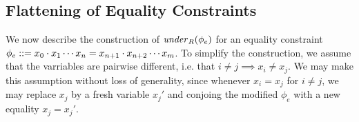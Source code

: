 \documentclass[sigplan,review,anonymous]{acmart}\settopmatter{printfolios=true,printccs=false,printacmref=false}
\begin{document}
%
%
%





\subsection{Flattening of Equality Constraints} \label{section:eq}

We now describe the construction of $\mathit{under}_R(\phi_e)$ for an equality constraint $\phi_e::= x_0\cdot x_1 \cdots x_n = x_{n+1}\cdot x_{n+2} \cdots x_m$. 
%
To simplify the construction, we assume that the varriables are pairwise different, i.e. that $i\neq j \implies x_i \neq x_j$. We may make this assumption without loss of generality, since whenever $x_i = x_j$ for $i \neq j$, we may replace $x_j$ by a fresh variable $x_j'$ and conjoing the modified $\phi_e$ with a new equality $x_j = x_j'$. 
%
\end{document}
